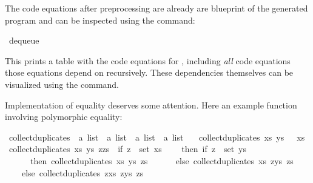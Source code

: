 \begin{isabellebody}
\begin{isamarkuptext}
  The code equations after preprocessing are already are blueprint of
  the generated program and can be inspected using the \hyperlink{command.code-thms}{\mbox{}} command:%
\end{isamarkuptext}%
\isamarkuptrue%
%
\isadelimquote
%
\endisadelimquote
%
\isatagquote
{}\isamarkupfalse%
\ dequeue%
\endisatagquote
{\isafoldquote}%
%
\isadelimquote
%
\endisadelimquote
%
\begin{isamarkuptext}%
\noindent This prints a table with the code equations for , including \emph{all} code equations those equations depend
  on recursively.  These dependencies themselves can be visualized using
  the \hypertarget{command.code-deps}{\hyperlink{command.code-deps}{\mbox{}}} command.%
\end{isamarkuptext}%
\isamarkuptrue%
%
\isamarkuptrue%
%
\begin{isamarkuptext}%
Implementation of equality deserves some attention.  Here an example
  function involving polymorphic equality:%
\end{isamarkuptext}%
\isamarkuptrue%
%
\isadelimquote
%
\endisadelimquote
%
\isatagquote
{}\isamarkupfalse%
\ collect{\isacharunderscore}duplicates\ {\isacharcolon}{\isacharcolon}\ {\isachardoublequoteopen}{\isacharprime}a\ list\ {\isasymRightarrow}\ {\isacharprime}a\ list\ {\isasymRightarrow}\ {\isacharprime}a\ list\ {\isasymRightarrow}\ {\isacharprime}a\ list{\isachardoublequoteclose}\ \isanewline
\ \ {\isachardoublequoteopen}collect{\isacharunderscore}duplicates\ xs\ ys\ {\isacharbrackleft}{\isacharbrackright}\ {\isacharequal}\ xs{\isachardoublequoteclose}\isanewline
{\isacharbar}\ {\isachardoublequoteopen}collect{\isacharunderscore}duplicates\ xs\ ys\ {\isacharparenleft}z{\isacharhash}zs{\isacharparenright}\ {\isacharequal}\ {\isacharparenleft}if\ z\ {\isasymin}\ set\ xs\isanewline
\ \ \ \ then\ if\ z\ {\isasymin}\ set\ ys\isanewline
\ \ \ \ \ \ then\ collect{\isacharunderscore}duplicates\ xs\ ys\ zs\isanewline
\ \ \ \ \ \ else\ collect{\isacharunderscore}duplicates\ xs\ {\isacharparenleft}z{\isacharhash}ys{\isacharparenright}\ zs\isanewline
\ \ \ \ else\ collect{\isacharunderscore}duplicates\ {\isacharparenleft}z{\isacharhash}xs{\isacharparenright}\ {\isacharparenleft}z{\isacharhash}ys{\isacharparenright}\ zs{\isacharparenright}{\isachardoublequoteclose}%
\endisatagquote

\end{isabellebody}
